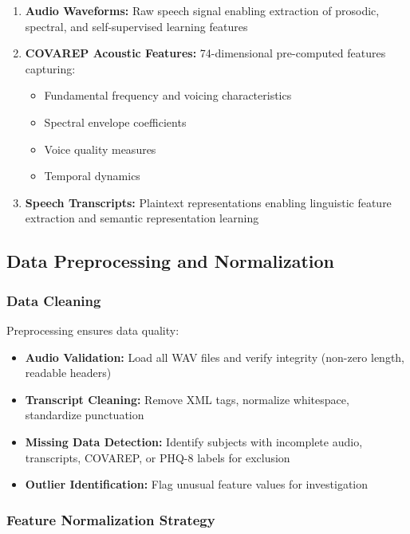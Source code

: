 \documentclass[12pt]{article}
\begin{document}
	\begin{enumerate}
		\item \textbf{Audio Waveforms:} Raw speech signal enabling extraction of prosodic, spectral, and self-supervised learning features

		\item \textbf{COVAREP Acoustic Features:} 74-dimensional pre-computed features capturing:
		\begin{itemize}
			\item Fundamental frequency and voicing characteristics
			\item Spectral envelope coefficients
			\item Voice quality measures
			\item Temporal dynamics
		\end{itemize}

		\item \textbf{Speech Transcripts:} Plaintext representations enabling linguistic feature extraction and semantic representation learning
	\end{enumerate}

	\subsection{Data Preprocessing and Normalization}

	\subsubsection{Data Cleaning}

	Preprocessing ensures data quality:

	\begin{itemize}
		\item \textbf{Audio Validation:} Load all WAV files and verify integrity (non-zero length, readable headers)
		\item \textbf{Transcript Cleaning:} Remove XML tags, normalize whitespace, standardize punctuation
		\item \textbf{Missing Data Detection:} Identify subjects with incomplete audio, transcripts, COVAREP, or PHQ-8 labels for exclusion
		\item \textbf{Outlier Identification:} Flag unusual feature values for investigation
	\end{itemize}

	\subsubsection{Feature Normalization Strategy}
\end{document}
